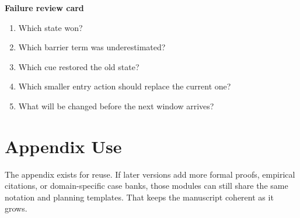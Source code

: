 \begin{templatebox}
\textbf{Failure review card}
\begin{enumerate}[nosep]
  \item Which state won?
  \item Which barrier term was underestimated?
  \item Which cue restored the old state?
  \item Which smaller entry action should replace the current one?
  \item What will be changed before the next window arrives?
\end{enumerate}
\end{templatebox}

\section{Appendix Use}

The appendix exists for reuse. If later versions add more formal proofs,
empirical citations, or domain-specific case banks, those modules can still
share the same notation and planning templates. That keeps the manuscript
coherent as it grows.


